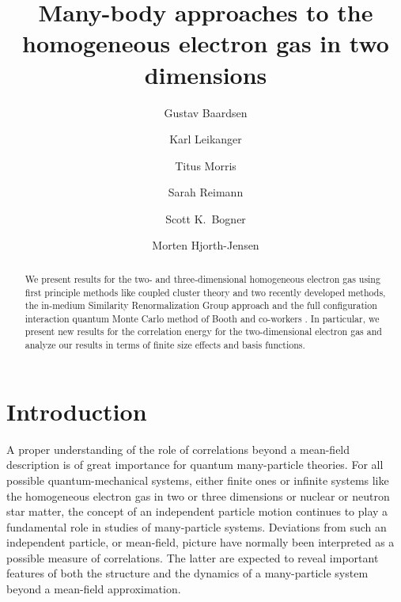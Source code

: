 \documentclass[aps,twocolumn,showpacs,floatfix,nofootinbib,preprintnumbers,superscriptaddress,amsmath,amssymb]{revtex4-1}
\begin{document}
\title{Many-body approaches to the homogeneous electron gas in two dimensions} 
\author{Gustav Baardsen}

\author{Karl Leikanger}

\author{Titus Morris}

\author{Sarah Reimann}

\author{Scott K.~Bogner}

\author{Morten Hjorth-Jensen} 

\begin{abstract} 
We present results for the two- and three-dimensional homogeneous
electron gas using first principle methods like coupled cluster
theory and two recently developed methods, the in-medium Similarity Renormalization
Group approach and the full configuration interaction quantum Monte
Carlo method of Booth and co-workers
\cite{booth2009,shepherd2012a,booth2013}. In particular, we present
new results for the correlation energy for the two-dimensional
electron gas and analyze our results in terms of finite size effects and basis functions.
\end{abstract}


\maketitle

\section{Introduction}
A proper understanding of the role of correlations beyond a mean-field
description is of great importance for quantum many-particle
theories. For all possible quantum-mechanical systems, either finite
ones or infinite systems like the homogeneous electron gas in two or
three dimensions or nuclear or neutron star matter, the concept of an
independent particle motion continues to play a fundamental role in
studies of many-particle systems.  Deviations from such an independent
particle, or mean-field, picture have normally been interpreted as a
possible measure of correlations.  The latter are expected to reveal
important features of both the structure and the dynamics of a
many-particle system beyond a mean-field approximation.
\end{document}
